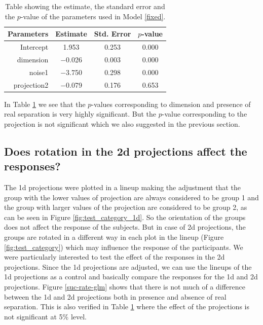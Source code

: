 \documentclass[12]{article}
\begin{document}
\begin{table}[ht]
\begin{center}
\caption{Table showing the estimate, the standard error and the $p$-value of the parameters used in Model \ref{fixed}.}
\vspace{0.15cm}
\begin{tabular}{r|ccc}
\hline
  \hline
 Parameters & Estimate & Std. Error  & $p$-value \\ 
  \hline
Intercept  & 1.953 & 0.253  & 0.000 \\ 
  dimension & $-$0.026 & 0.003  & 0.000 \\ 
  noise1 & $-$3.750 & 0.298  & 0.000 \\ 
  projection2 & $-$0.079 & 0.176  & 0.653 \\ 
   \hline
\end{tabular}
\label{params}
\end{center}
\end{table}

In Table \ref{params} we see that the $p$-values corresponding to dimension and presence of real separation is very highly significant. But the $p$-value corresponding to the projection is not significant which we also suggested in the previous section.

\subsection{Does rotation in the 2d projections affect the responses?}

The 1d projections were plotted in a lineup making the adjustment that the group with the lower values of projection are always considered to be group 1 and the group with larger values of the projection are considered to be group 2, as can be seen in Figure \ref{fig:test_category_1d}. So the orientation of the groups does not affect the response of the subjects. But in case of 2d projections, the groups are rotated in a different way in each plot in the lineup (Figure \ref{fig:test_category}) which may influence the response of the participants. We were particularly interested to test the effect of the responses in the 2d projections. Since the 1d projections are adjusted, we can use the lineups of the 1d projections as a control and basically compare the responses for the 1d and 2d projections. Figure \ref{suc-rate-glm} shows that there is not much of a difference between the 1d and 2d projections both in presence and absence of real separation. This is also verified in Table \ref{params} where the effect of the projections is not significant at 5\% level.  
\end{document}
